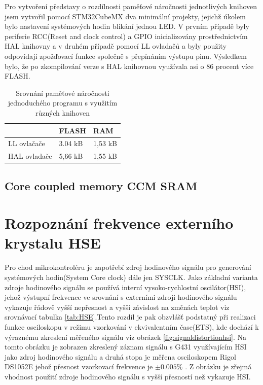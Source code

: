 Pro vytvoření představy o rozdílnosti paměťové náročnosti jednotlivých knihoven jsem vytvořil pomocí STM32CubeMX dva minimální projekty, jejichž úkolem bylo nastavení systémových hodin blikání jednou LED. V prvním případě byly periferie RCC(Reset and clock control) a GPIO inicializovány prostřednictvím HAL knihovny a v druhém případě pomocí LL ovladačů a byly použity odpovídají zpožďovací funkce společně s přepínáním výstupu pinu. Výsledkem bylo, že  po zkompilování verze s HAL knihovnou využívala asi o 86 procent více FLASH.

\begin{table}[H]
	\begin{tabular}{l|ll}
		& FLASH   & RAM     \\ \hline
		LL ovlačače                       & 3.04 kB & 1,53 kB \\
		\multicolumn{1}{c|}{HAL ovladače} & 5,66 kB & 1,55 kB
	\end{tabular}
	\caption{Srovnání paměťové náročnosti jednoduchého programu s využitím různých knihoven}
	\label{tab:LL_HAL_MemoryUsage}
\end{table}	
\subsection{Core coupled memory CCM SRAM}


\section{Rozpoznání frekvence externího krystalu HSE}
Pro chod mikrokontroléru je zapotřebí zdroj hodinového signálu pro generování systémových hodin(System Core clock) dále jen SYSCLK. Jako základní varianta zdroje hodinového signálu se používá interní vysoko-rychlostní oscilátor(HSI), jehož výstupní frekvence ve srovnání s externími zdroji hodinového signálu vykazuje řádově vyšší nepřesnost a vyšší závislost na změnách teplot viz srovnávací tabulka \ref{tab:HSE}.Tento rozdíl je pak obzvlášť podstatný při realizaci funkce osciloskopu v režimu vzorkování v ekvivalentním čase(ETS), kde dochází k výraznému zkreslení měřeného signálu viz obrázek \ref{fig:signaldistortionhsi}. Na tomto obrázku je zobrazen zkreslený záznam signálu s G431 využívajícím HSI jako zdroj hodinového signálu a druhá stopa je měřena osciloskopem Rigol DS1052E jehož přesnost vzorkovací frekvence je $\pm0.005\%$ \cite{ScopeRigol}. Z obrázku je zřejmá vhodnost použití zdroje hodinového signálu s vyšší přesností než vykazuje HSI.


